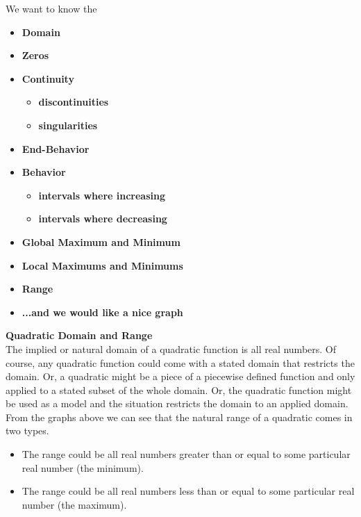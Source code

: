 \documentclass{ximera}
\begin{document}
We want to know the 
\begin{itemize}
     \item \textbf{\textcolor{red!80!black}{Domain}} 
     \item \textbf{\textcolor{red!80!black}{Zeros}} 
     \item \textbf{\textcolor{red!80!black}{Continuity}} 
\begin{itemize}
     \item \textbf{\textcolor{purple!85!blue}{discontinuities}} 
     \item \textbf{\textcolor{purple!85!blue}{singularities}} 
\end{itemize}
     \item \textbf{\textcolor{red!80!black}{End-Behavior}} 
     \item \textbf{\textcolor{red!80!black}{Behavior}} 
\begin{itemize}
     \item \textbf{\textcolor{purple!85!blue}{intervals where increasing}} 
     \item \textbf{\textcolor{purple!85!blue}{intervals where decreasing}} 
\end{itemize}
     \item \textbf{\textcolor{red!80!black}{Global Maximum and Minimum}} 
     \item \textbf{\textcolor{red!80!black}{Local Maximums and Minimums}} 
     \item \textbf{\textcolor{red!80!black}{Range}} 
     \item \textbf{\textcolor{blue!55!black}{...and we would like a nice graph}} 
\end{itemize}



\textbf{\textcolor{blue!75!black}{Quadratic Domain and Range}} \\


The implied or natural domain of a quadratic function is all real numbers.  Of course, any quadratic function could come with a stated domain that restricts the domain. Or, a quadratic might be a piece of a piecewise defined function and only applied to a stated subset of the whole domain. Or, the quadratic function might be used as a model and the situation restricts the domain to an applied domain. \\


From the graphs above we can see that the natural range of a quadratic comes in two types.  

\begin{itemize}
\item The range could be all real numbers greater than or equal to some particular real number (the minimum).
\item The range could be all real numbers less than or equal to some particular real number (the maximum).
\end{itemize}
\end{document}
